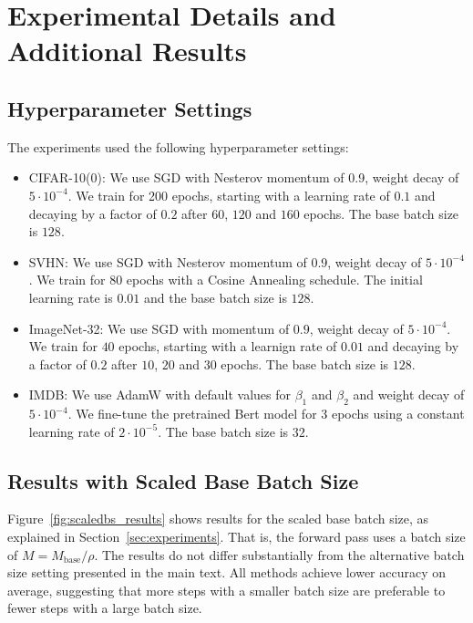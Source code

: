 \documentclass{article}
\theoremstyle{plain}
\theoremstyle{definition}
\theoremstyle{remark}
\begin{document}
\section{Experimental Details and Additional Results}
\label{app:experiment_details}

\subsection{Hyperparameter Settings}
The experiments used the following hyperparameter settings:
\begin{itemize}
    \item CIFAR-10(0): We use SGD with Nesterov momentum of 0.9, weight decay of $5\cdot 10^{-4}$. We train for 200 epochs, starting with a learning rate of $0.1$ and decaying by a factor of $0.2$ after $60$, $120$ and $160$ epochs. The base batch size is $128$.
    \item SVHN: We use SGD with Nesterov momentum of 0.9, weight decay of $5\cdot 10^{-4}$. We train for $80$ epochs with a Cosine Annealing schedule. The initial learning rate is $0.01$ and the base batch size is $128$.
    \item ImageNet-32: We use SGD with momentum of $0.9$, weight decay of $5\cdot 10^{-4}$. We train for $40$ epochs, starting with a learnign rate of $0.01$ and decaying by a factor of $0.2$ after $10$, $20$ and $30$ epochs. The base batch size is $128$.
    \item IMDB: We use AdamW with default values for $\beta_1$ and $\beta_2$ and weight decay of $5\cdot 10^{-4}$.
    We fine-tune the pretrained Bert model for $3$ epochs using a constant learning rate of $2\cdot 10^{-5}$.
    The base batch size is $32$.
\end{itemize}

\subsection{Results with Scaled Base Batch Size}

Figure~\ref{fig:scaledbs_results} shows results for the scaled base batch size, as explained in Section~\ref{sec:experiments}.
That is, the forward pass uses a batch size of $M=M_\text{base} / \rho$.
The results do not differ substantially from the alternative batch size setting presented in the main text.
All methods achieve lower accuracy on average, suggesting that more steps with a smaller batch size are preferable to fewer steps with a large batch size.
\end{document}

